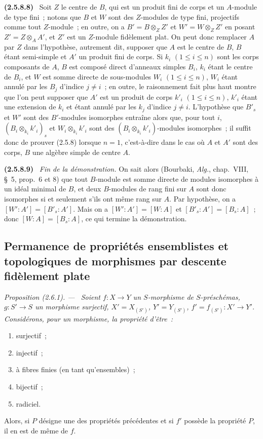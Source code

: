 \documentclass[10pt,oneside]{book}
\makeatletter
\newcommand{\oldpage}[2][]{%
  \setcounter{footnote}{0}%
  \marginpar{\scriptsize\textbf{#1}~|~#2}\ignorespaces}
\newenvironment{env}[1][]{\par\medskip\noindent\textbf{(#1)}\ }{\par}
\newenvironment{proposition}[1][]{%
  \par\medskip\noindent\itshape Proposition (#1). ---\ }{\par}
\newcommand{\EGAReaderTarget}[2]{\hypertarget{#1}{}\@bsphack\begingroup\def\@currentHref{#1}\label{#2}\endgroup\@esphack}
\makeatother
\begin{document}
\begin{env}[2.5.8.8]
Soit $Z$ le centre de $B$, qui est un produit fini de corps et un $A$-module
de type fini~; notons que $B$ et $W$ sont des $Z$-modules de type fini,
projectifs comme tout $Z$-module~; en outre, on a
$B'=B\otimes_Z Z'$ et $W'=W\otimes_Z Z'$ en posant
$Z'=Z\otimes_A A'$, et $Z'$ est un $Z$-module fidèlement plat. On peut donc
remplacer $A$ par $Z$ dans l'hypothèse, autrement dit, supposer que $A$ est
le centre de $B$, $B$ étant semi-simple et $A'$ un produit fini de corps. Si
$k_i$ $(1\leq i\leq n)$ sont les corps composants de $A$, $B$ est composé
direct d'anneaux simples $B_i$, $k_i$ étant le centre de $B_i$, et $W$ est
somme directe de sous-modules $W_i$ $(1\leq i\leq n)$, $W_i$ étant annulé
par les $B_j$ d'indice $j\ne i$~; en outre, le raisonnement fait plus haut
montre que l'on peut supposer que $A'$ est un produit de corps $k'_i$
$(1\leq i\leq n)$, $k'_i$ étant une extension de $k_i$ et étant annulé par
les $k_j$ d'indice $j\ne i$. L'hypothèse que $B'_s$ et $W'$ sont des
$B'$-modules isomorphes entraîne alors que, pour
\oldpage[IV-2]{27}
tout $i$,
$(B_i\otimes_{k_i}k'_i)_s$ et $W_i\otimes_{k_i}k'_i$ sont des
$(B_i\otimes_{k_i}k'_i)$-modules isomorphes~; il suffit donc de prouver
(2.5.8) lorsque $n=1$, c'est-à-dire dans le cas où $A$ et $A'$ sont des
corps, $B$ une algèbre simple de centre $A$.
\end{env}

\begin{env}[2.5.8.9]
\label{IV.2.5.8.9-fr}
\emph{Fin de la démonstration.} On sait alors (Bourbaki, \emph{Alg.},
chap.~VIII, \S~5, prop.~6 et 8) que tout $B$-module est somme directe de
modules isomorphes à un idéal minimal de $B$, et deux $B$-modules de rang
fini sur $A$ sont donc isomorphes si et seulement s'ils ont même rang sur
$A$. Par hypothèse, on a $[W':A']=[B'_s:A']$. Mais on a
$[W':A']=[W:A]$ et $[B'_s:A']=[B_s:A]$~; donc $[W:A]=[B_s:A]$, ce qui
termine la démonstration.
\end{env}

\subsection{Permanence de propriétés ensemblistes et topologiques de morphismes
par descente fidèlement plate}
\label{subsection:IV.2.6-fr}

\begin{proposition}[2.6.1]
\EGAReaderTarget{ega4.c04.prop.2-6-1}{IV.2.6.1-fr}
Soient $f:X\to Y$ un $S$-morphisme de $S$-préschémas, $g:S'\to S$ un
morphisme surjectif, $X'=X_{(S')}$, $Y'=Y_{(S')}$,
$f'=f_{(S')}:X'\to Y'$. Considérons, pour un morphisme, la propriété d'être~:
\begin{enumerate}
\item[(i)] surjectif~;
\item[(ii)] injectif~;
\item[(iii)] à fibres finies (en tant qu'ensembles)~;
\item[(iv)] bijectif~;
\item[(v)] radiciel.
\end{enumerate}
Alors, si $P$ désigne une des propriétés précédentes et si $f'$ possède la
propriété $P$, il en est de même de $f$.
\end{proposition}
\end{document}
